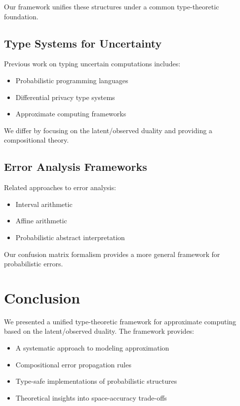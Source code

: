 \documentclass[11pt]{article}
\begin{document}
Our framework unifies these structures under a common type-theoretic foundation.

\subsection{Type Systems for Uncertainty}

Previous work on typing uncertain computations includes:
\begin{itemize}
\item Probabilistic programming languages \cite{gordon2014}
\item Differential privacy type systems \cite{reed2010}
\item Approximate computing frameworks \cite{sampson2011}
\end{itemize}

We differ by focusing on the latent/observed duality and providing a compositional theory.

\subsection{Error Analysis Frameworks}

Related approaches to error analysis:
\begin{itemize}
\item Interval arithmetic \cite{moore1966}
\item Affine arithmetic \cite{stolfi1997}
\item Probabilistic abstract interpretation \cite{cousot1977}
\end{itemize}

Our confusion matrix formalism provides a more general framework for probabilistic errors.

\section{Conclusion}

We presented a unified type-theoretic framework for approximate computing based on the latent/observed duality. The framework provides:
\begin{itemize}
\item A systematic approach to modeling approximation
\item Compositional error propagation rules
\item Type-safe implementations of probabilistic structures
\item Theoretical insights into space-accuracy trade-offs
\end{itemize}
\end{document}

